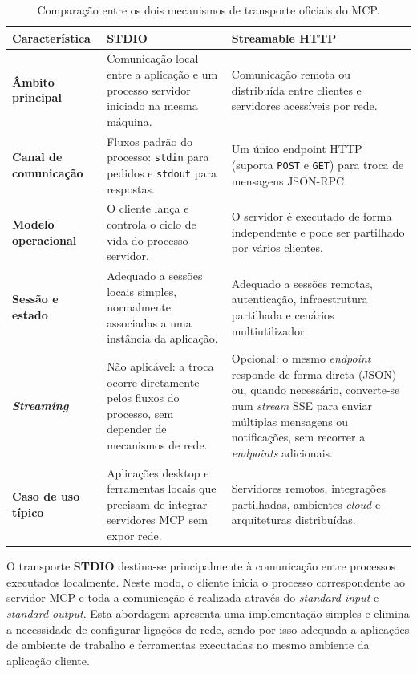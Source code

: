 \begin{table}[H]
\centering
\footnotesize
\renewcommand{\arraystretch}{1.35}
\begin{tabularx}{\textwidth}{|>{\raggedright\arraybackslash}p{3cm}|Y|Y|}
\hline
\textbf{Característica} & \textbf{STDIO} & \textbf{Streamable HTTP} \\
\hline
\textbf{Âmbito principal} & Comunicação local entre a aplicação e um processo servidor iniciado na mesma máquina. & Comunicação remota ou distribuída entre clientes e servidores acessíveis por rede. \\
\hline
\textbf{Canal de comunicação} & Fluxos padrão do processo: \texttt{stdin} para pedidos e \texttt{stdout} para respostas. & Um único endpoint HTTP (suporta \texttt{POST} e \texttt{GET}) para troca de mensagens JSON-RPC. \\
\hline
\textbf{Modelo operacional} & O cliente lança e controla o ciclo de vida do processo servidor. & O servidor é executado de forma independente e pode ser partilhado por vários clientes. \\
\hline
\textbf{Sessão e estado} & Adequado a sessões locais simples, normalmente associadas a uma instância da aplicação. & Adequado a sessões remotas, autenticação, infraestrutura partilhada e cenários multiutilizador. \\
\hline
\textbf{\textit{Streaming}} & Não aplicável: a troca ocorre diretamente pelos fluxos do processo, sem depender de mecanismos de rede. & Opcional: o mesmo \textit{endpoint} responde de forma direta (JSON) ou, quando necessário, converte-se num \textit{stream} SSE para enviar múltiplas mensagens ou notificações, sem recorrer a \textit{endpoints} adicionais. \\
\hline
\textbf{Caso de uso típico} & Aplicações desktop e ferramentas locais que precisam de integrar servidores MCP sem expor rede. & Servidores remotos, integrações partilhadas, ambientes \textit{cloud} e arquiteturas distribuídas. \\
\hline
\end{tabularx}
\caption{Comparação entre os dois mecanismos de transporte oficiais do MCP.}
\label{tab:mcp_transport}
\end{table}

O transporte \textbf{STDIO} destina-se principalmente à comunicação entre processos
executados localmente. Neste modo, o cliente inicia o processo correspondente ao servidor MCP e toda a comunicação é realizada através do \textit{standard input} e \textit{standard output}. Esta abordagem apresenta uma
implementação simples e elimina a necessidade de configurar ligações de rede, sendo
por isso adequada a aplicações de ambiente de trabalho e ferramentas executadas no
mesmo ambiente da aplicação cliente.

